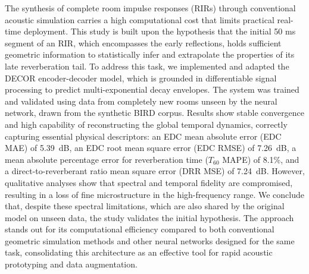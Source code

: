 The synthesis of complete room impulse responses (RIRs) through conventional acoustic simulation carries a high computational cost that limits practical real-time deployment. This study is built upon the hypothesis that the initial 50 ms segment of an RIR, which encompasses the early reflections, holds sufficient geometric information to statistically infer and extrapolate the properties of its late reverberation tail. To address this task, we implemented and adapted the DECOR encoder-decoder model, which is grounded in differentiable signal processing to predict multi-exponential decay envelopes. The system was trained and validated using data from completely new rooms unseen by the neural network, drawn from the synthetic BIRD corpus. Results show stable convergence and high capability of reconstructing the global temporal dynamics, correctly capturing essential physical descriptors: an EDC mean absolute error (EDC MAE) of 5.39~dB, an EDC root mean square error (EDC RMSE) of 7.26~dB, a mean absolute percentage error for reverberation time ($T_{60}$ MAPE) of 8.1\%, and a direct-to-reverberant ratio mean square error (DRR MSE) of 7.24~dB. However, qualitative analyses show that spectral and temporal fidelity are compromised, resulting in a loss of fine microstructure in the high-frequency range. We conclude that, despite these spectral limitations, which are also shared by the original model on unseen data, the study validates the initial hypothesis. The approach stands out for its computational efficiency compared to both conventional geometric simulation methods and other neural networks designed for the same task, consolidating this architecture as an effective tool for rapid acoustic prototyping and data augmentation.
\vfill %

